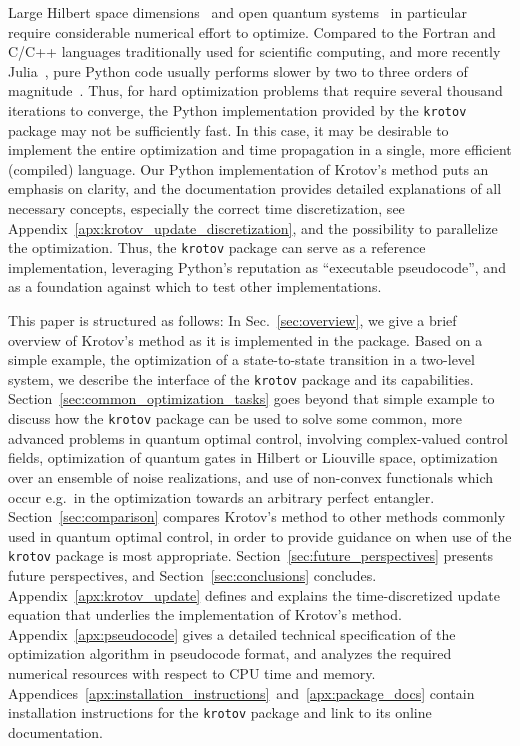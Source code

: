\documentclass[submission, Phys]{SciPost}
\begin{document}
Large Hilbert space
dimensions~\cite{GoerzEPJQT2015,GoerzNPJQI17,CuiQST17,PatschPRA18} and open
quantum systems~\cite{GoerzNJP2014} in particular require considerable numerical
effort to optimize.
Compared to the Fortran and C/C++ languages traditionally used for scientific
computing, and more recently Julia~\cite{BezansonSIREV2017}, pure Python code
usually performs slower by two to three orders of
magnitude~\cite{AkeretAC2015,EichhornCSJ2018}.
Thus, for hard optimization problems that require several thousand iterations to
converge, the Python implementation provided by the \texttt{krotov} package may
not be sufficiently fast.
In this case, it may be desirable to implement the entire optimization and time
propagation in a single, more efficient (compiled) language.
Our Python implementation of Krotov's method puts an emphasis on clarity, and
the documentation provides detailed explanations of all necessary concepts,
especially the correct time discretization, see
Appendix~\ref{apx:krotov_update_discretization}, and the possibility to
parallelize the optimization.
Thus, the \texttt{krotov} package can serve as a reference implementation,
leveraging Python's reputation as ``executable pseudocode'', and as a foundation
against which to test other implementations.

This paper is structured as follows: In Sec.~\ref{sec:overview}, we give a brief
overview of Krotov's method as it is implemented in the package.
Based on a simple example, the optimization of a state-to-state transition in a
two-level system, we describe the interface of the \texttt{krotov} package and
its capabilities.
Section~\ref{sec:common_optimization_tasks} goes beyond that simple example to
discuss how the \texttt{krotov} package can be used to solve some common, more
advanced problems in quantum optimal control, involving complex-valued control
fields, optimization of quantum gates in Hilbert or Liouville space,
optimization over an ensemble of noise realizations, and  use of non-convex
functionals which occur e.g.\ in the optimization towards an arbitrary perfect
entangler.
Section~\ref{sec:comparison} compares Krotov's method to other methods commonly
used in quantum optimal control, in order to provide guidance on when use of the
\texttt{krotov} package is most appropriate.
Section~\ref{sec:future_perspectives} presents future perspectives, and
Section~\ref{sec:conclusions} concludes.
Appendix~\ref{apx:krotov_update} defines and explains the time-discretized
update equation that underlies the implementation of Krotov's method.
Appendix~\ref{apx:pseudocode} gives a detailed technical specification of the
optimization algorithm in pseudocode format, and analyzes the required numerical
resources with respect to CPU time and memory.
Appendices~\ref{apx:installation_instructions}~and~\ref{apx:package_docs}
contain installation instructions for the \texttt{krotov} package and link to
its online documentation.
\end{document}
